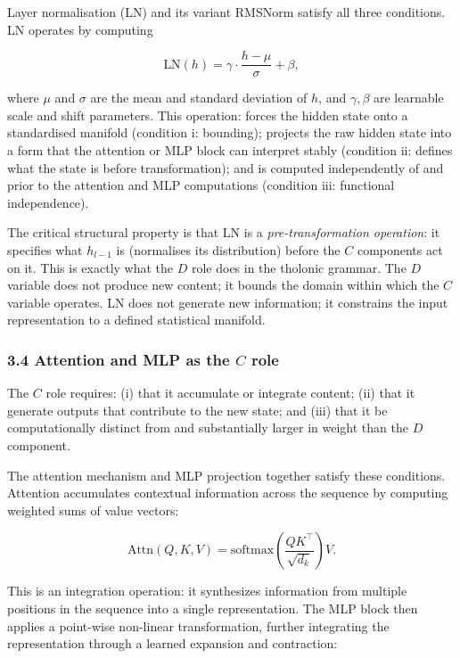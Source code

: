 \documentclass[12pt]{article}
\begin{document}
Layer normalisation (LN) and its variant RMSNorm satisfy all three
conditions. LN operates by computing

\[\text{LN}(h) = \gamma \cdot \frac{h - \mu}{\sigma} + \beta,\]

where \(\mu\) and \(\sigma\) are the mean and standard deviation of
\(h\), and \(\gamma, \beta\) are learnable scale and shift parameters.
This operation: forces the hidden state onto a standardised manifold
(condition i: bounding); projects the raw hidden state into a form that
the attention or MLP block can interpret stably (condition ii: defines
what the state is before transformation); and is computed independently
of and prior to the attention and MLP computations (condition iii:
functional independence).

The critical structural property is that LN is a
\emph{pre-transformation operation}: it specifies what \(h_{l-1}\) is
(normalises its distribution) before the \(C\) components act on it.
This is exactly what the \(D\) role does in the tholonic grammar. The
\(D\) variable does not produce new content; it bounds the domain within
which the \(C\) variable operates. LN does not generate new information;
it constrains the input representation to a defined statistical
manifold.

\subsubsection{\texorpdfstring{3.4 Attention and MLP as the \(C\)
role}{3.4 Attention and MLP as the C role}}\label{attention-and-mlp-as-the-c-role}

The \(C\) role requires: (i) that it accumulate or integrate content;
(ii) that it generate outputs that contribute to the new state; and
(iii) that it be computationally distinct from and substantially larger
in weight than the \(D\) component.

The attention mechanism and MLP projection together satisfy these
conditions. Attention accumulates contextual information across the
sequence by computing weighted sums of value vectors:

\[\text{Attn}(Q, K, V) = \text{softmax}\!\left(\frac{QK^\top}{\sqrt{d_k}}\right) V.\]

This is an integration operation: it synthesizes information from
multiple positions in the sequence into a single representation. The MLP
block then applies a point-wise non-linear transformation, further
integrating the representation through a learned expansion and
contraction:
\end{document}
